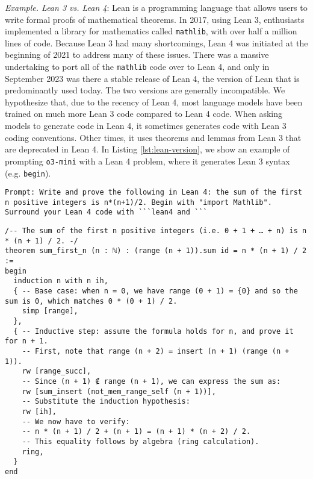 \begin{tcolorbox}[colback=lightblue, boxrule=0pt, arc=5pt, outer arc=5pt, after skip=10pt plus 2pt]
\textit{Example. Lean 3 vs. Lean 4}: Lean \citep{de2015lean} is a programming language that allows users to write formal proofs of mathematical theorems. In 2017, using Lean 3, enthusiasts implemented a library for mathematics called \texttt{mathlib}, with over half a million lines of code. Because Lean 3 had many shortcomings, Lean 4 \citep{moura2021lean} was initiated at the beginning of 2021 to address many of these issues. There was a massive undertaking to port all of the \texttt{mathlib} code over to Lean 4, and only in September 2023 was there a stable release of Lean 4, the version of Lean that is predominantly used today. The two versions are generally incompatible. We hypothesize that, due to the recency of Lean 4, most language models have been trained on much more Lean 3 code compared to Lean 4 code. When asking models to generate code in Lean 4, it sometimes generates code with Lean 3 coding conventions. Other times, it uses theorems and lemmas from Lean 3 that are deprecated in Lean 4. In Listing \ref{lst:lean-version}, we show an example of prompting \texttt{o3-mini} with a Lean 4 problem, where it generates Lean 3 syntax (e.g. \texttt{begin}).

\begin{lstlisting}[breaklines=true, style=mystyle]
Prompt: Write and prove the following in Lean 4: the sum of the first n positive integers is n*(n+1)/2. Begin with "import Mathlib". Surround your Lean 4 code with ```lean4 and ```
\end{lstlisting}

\begin{lstlisting}[label={lst:lean-version}, captionpos=t, language=lean, breaklines=true, style=mystyle]
/-- The sum of the first n positive integers (i.e. 0 + 1 + … + n) is n * (n + 1) / 2. -/
theorem sum_first_n (n : ℕ) : (range (n + 1)).sum id = n * (n + 1) / 2 :=
begin
  induction n with n ih,
  { -- Base case: when n = 0, we have range (0 + 1) = {0} and so the sum is 0, which matches 0 * (0 + 1) / 2.
    simp [range],
  },
  { -- Inductive step: assume the formula holds for n, and prove it for n + 1.
    -- First, note that range (n + 2) = insert (n + 1) (range (n + 1)).
    rw [range_succ],
    -- Since (n + 1) ∉ range (n + 1), we can express the sum as:
    rw [sum_insert (not_mem_range_self (n + 1))],
    -- Substitute the induction hypothesis:
    rw [ih],
    -- We now have to verify:
    -- n * (n + 1) / 2 + (n + 1) = (n + 1) * (n + 2) / 2.
    -- This equality follows by algebra (ring calculation).
    ring,
  }
end
\end{lstlisting}
\end{tcolorbox}

